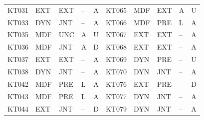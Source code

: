 \documentclass[lettersize,journal]{IEEEtran}
\begin{document}
\begin{table}[t]
\begin{tabular}{@{}lllll@{\hspace{1.4em}}lllll@{}}
KT031 & EXT & EXT & -- & A & KT065 & MDF & EXT & A & U \\
KT033 & DYN & JNT & -- & A & KT066 & MDF & PRE & L & A \\
KT035 & MDF & UNC & A & U & KT067 & EXT & EXT & -- & A \\
KT036 & MDF & JNT & A & D & KT068 & EXT & EXT & -- & A \\
KT037 & EXT & EXT & -- & A & KT069 & DYN & PRE & -- & U \\
KT038 & DYN & JNT & -- & A & KT070 & DYN & JNT & -- & A \\
KT042 & MDF & PRE & L & A & KT076 & EXT & PRE & -- & D \\
KT043 & MDF & PRE & L & A & KT077 & DYN & JNT & -- & A \\
KT044 & EXT & JNT & -- & D & KT079 & DYN & JNT & -- & A \\
\bottomrule
\end{tabular}
\end{table}
\end{document}
